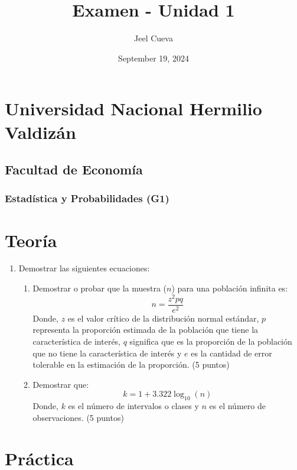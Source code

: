 \documentclass{article}
\title{Examen - Unidad 1}
\author{Jeel Cueva}
\date{September 19, 2024}
\begin{document}
\maketitle

\section*{Universidad Nacional Hermilio Valdizán}
\subsection*{Facultad de Economía}

\subsubsection*{Estadística y Probabilidades (G1)}

\section*{Teoría}

\begin{enumerate}
    \item Demostrar las siguientes ecuaciones:
    \begin{enumerate}
        \item Demostrar o probar que la muestra ($n$) para una población infinita es:
\[
        n = \frac{z^2pq}{e^2}
\]
        Donde, $z$ es el valor crítico de la distribución normal estándar, $p$ representa la proporción estimada de la población que tiene la característica de interés, $q$ significa que es la proporción de la población que no tiene la característica de interés y $e$ es la cantidad de error tolerable en la estimación de la proporción. (5 puntos)
        
        \item Demostrar que:
\[
        k = 1 + 3.322 \log_{10}(n)
\]
        Donde, $k$ es el número de intervalos o clases y $n$ es el número de observaciones. (5 puntos)
    \end{enumerate}
\end{enumerate}

\section*{Práctica}
\end{document}
